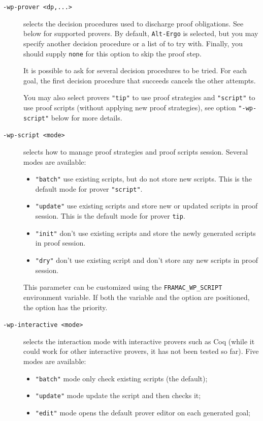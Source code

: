 \begin{description}
\item[\tt -wp-prover <dp,...>] selects the decision procedures used to
  discharge proof obligations. See below for supported provers.  By
  default, \texttt{Alt-Ergo} is selected, but you may specify another
  decision procedure or a list of to try with.  Finally, you should
  supply \texttt{none} for this option to skip the proof step.

  It is possible to ask for several decision procedures to be tried.
  For each goal, the first decision procedure that succeeds cancels the
  other attempts.

  You may also select provers \verb|"tip"| to use proof strategies and \verb|"script"| to use
  proof scripts (without applying new proof strategies),
  see option \verb|"-wp-script"| below for more details.
\item[\tt -wp-script <mode>] selects how to manage proof strategies and proof
  scripts session. Several modes are available:
  \begin{itemize}
  \item \texttt{"batch"} use existing scripts, but do not store new scripts.
    This is the default mode for prover \verb|"script"|.
  \item \texttt{"update"} use existing scripts and store new or updated scripts in proof session.
    This is the default mode for prover \verb|tip|.
  \item \texttt{"init"} don't use existing scripts and store the newly generated
    scripts in proof session.
  \item \texttt{"dry"} don't use existing script and don't store any new scripts in proof session.
  \end{itemize}
  This parameter can be customized using the \verb|FRAMAC_WP_SCRIPT| environment
  variable. If both the variable and the option are positioned, the option has
  the priority.
\item[\tt -wp-interactive <mode>] selects the interaction mode with
  interactive provers such as Coq (while it could work for other interactive
  provers, it has not been tested so far). Five modes are available:
  \begin{itemize}
  \item \texttt{"batch"} mode only check existing scripts (the default);
  \item \texttt{"update"} mode update the script and then checks it;
  \item \texttt{"edit"} mode opens the default prover editor on each generated goal;

\end{itemize}
\end{description}
